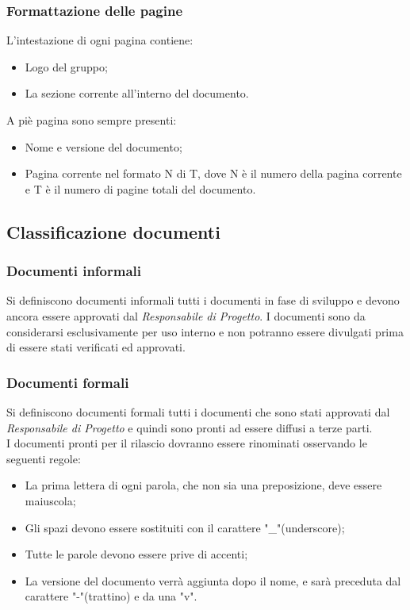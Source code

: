 \subsubsection{Formattazione delle pagine}
L'intestazione di ogni pagina contiene:
\begin{itemize}
	\item Logo del gruppo;
	\item La sezione corrente all'interno del documento.
\end{itemize}
A piè pagina sono sempre presenti:
\begin{itemize}
	\item Nome e versione del documento;
	\item Pagina corrente nel formato N di T, dove N è il numero della pagina corrente e T è il numero di pagine totali del documento.
\end{itemize}

\subsection{Classificazione documenti}
\subsubsection{Documenti informali}
Si definiscono documenti informali tutti i documenti in fase di sviluppo e devono ancora essere approvati dal \textit{Responsabile di Progetto}. I documenti sono da considerarsi esclusivamente per uso interno e non potranno essere divulgati prima di essere stati verificati ed approvati. 
\subsubsection{Documenti formali}
Si definiscono documenti formali tutti i documenti che sono stati approvati dal \textit{Responsabile di Progetto} e quindi sono pronti ad essere diffusi a terze parti.\\
I documenti pronti per il rilascio dovranno essere rinominati osservando le seguenti regole:
\begin{itemize}
	\item La prima lettera di ogni parola, che non sia una preposizione, deve essere maiuscola;
	\item Gli spazi devono essere sostituiti con il carattere "\_"(underscore);
	\item Tutte le parole devono essere prive di accenti;
	\item La versione del documento verrà aggiunta dopo il nome, e sarà preceduta dal carattere "-"(trattino) e da una "v".
\end{itemize}

